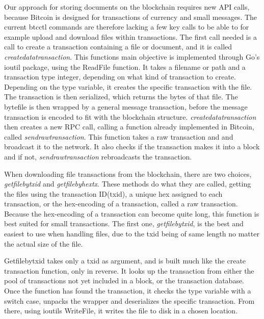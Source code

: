 \documentclass[11pt]{article}
\begin{document}
Our approach for storing documents on the blockchain requires new API calls, because Bitcoin is designed for transactions of currency and small messages. The current btcctl commands are therefore lacking a few key calls to be able to for example upload and download files within transactions. The first call needed is a call to create a transaction containing a file or document, and it is called \textit{createdatatransaction}. This functions main objective is implemented through Go's ioutil package, using the ReadFile function. It takes a filename or path and a transaction type integer, depending on what kind of transaction to create. Depending on the type variable, it creates the specific transaction with the file. The transaction is then serialized, which returns the bytes of that file. The bytefile is then wrapped by a general message transaction, before the message transaction is encoded to fit with the blockchain structure. \textit{createdatatransaction} then creates a new RPC call, calling a function already implemented in Bitcoin, called \textit{sendrawtransaction}. This function takes a raw transaction and and broadcast it to the network. It also checks if the transaction makes it into a block and if not, \textit{sendrawtransaction} rebroadcasts the transaction. 

When downloading file transactions from the blockchain, there are two choices, \textit{getfilebytxid} and \textit{getfilebyhextx}. These methods do what they are called, getting the files using the transaction ID(txid), a unique hex assigned to each transaction, or the hex-encoding of a transaction, called a raw transaction.  Because the hex-encoding of a transaction can become quite long, this function is best suited for small transactions. The first one, \textit{getfilebytxid}, is the best and easiest to use when handling files, due to the txid being of same length no matter the actual size of the file. 

Getfilebytxid takes only a txid as argument, and is built much like the create transaction function, only in reverse. It looks up the transaction from either the pool of transactions not yet included in a block, or the transaction database. Once the function has found the transaction, it checks the type variable with a switch case, unpacks the wrapper and deserializes the specific transaction. From there, using ioutils WriteFile, it writes the file to disk in a chosen location. 
\end{document}
